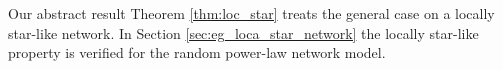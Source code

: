 \documentclass[a4paper]{article}
\theoremstyle{plain}
\theoremstyle{definition}
\begin{document}





Our abstract result Theorem \ref{thm:loc_star} treats the general case on a locally star-like network. In Section \ref{sec:eg_loca_star_network} the locally star-like property is verified for the random power-law network model.

\end{document}
